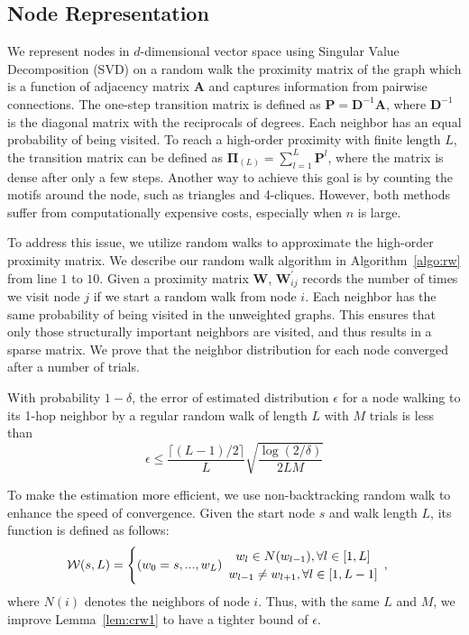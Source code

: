 \subsection{Node Representation} \label{ssec:ne}
We represent nodes in $d$-dimensional vector space using Singular Value Decomposition (SVD) on a random walk the proximity matrix of the graph which is a function of adjacency matrix ${\boldsymbol A}$ and captures information from pairwise connections.
The one-step transition matrix is defined as ${\boldsymbol P}={\boldsymbol D}^{-1}{\boldsymbol A}$, where ${\boldsymbol D}^{-1}$ is the diagonal matrix with the reciprocals of degrees. Each neighbor has an equal probability of being visited.
To reach a high-order proximity with finite length $L$, the transition matrix can be defined as ${\boldsymbol \Pi}_{(L)}=\sum_{l=1}^{L}{{\boldsymbol P}^{l}}$, where the matrix is dense after only a few steps.
Another way to achieve this goal is by counting the motifs around the node, such as triangles and 4-cliques. 
However, both methods suffer from computationally expensive costs, especially when $n$ is large.

To address this issue, we utilize random walks to approximate the high-order proximity matrix. We describe our random walk algorithm in Algorithm~\ref{algo:rw} from line $1$ to $10$. Given a proximity matrix ${\boldsymbol W}$, ${\boldsymbol W}^{'}_{ij}$ records the number of times we visit node $j$ if we start a random walk from node $i$. Each neighbor has the same probability of being visited in the unweighted graphs.
This ensures that only those structurally important neighbors are visited, and thus results in a sparse matrix.
We prove that the neighbor distribution for each node converged after a number of trials.

\begin{lemma}  \label{lem:crw1}
With probability $1 - \delta$, the error of estimated distribution $\epsilon$ for a node walking to its 1-hop neighbor by a regular random walk of length $L$ with $M$ trials is less than
\begin{equation}
    \epsilon \leq \frac{\lceil (L - 1) / 2 \rceil}{L} \sqrt{\frac{\log{(2/\delta)}}{2LM}}
\end{equation}
\end{lemma}

To make the estimation more efficient, we use non-backtracking random walk to enhance the speed of convergence.
Given the start node $s$ and walk length $L$, its function is defined as follows:
\begin{equation}
\mathcal{W}(s, L) = 
\begin{cases} (w_{0}=s, ..., w_{L}) \space 
\begin{array}{c}
w_{l} \in N{(w_{l-1})}, \forall l \in [1, L]
\\
w_{l-1} \neq w_{l+1}, \forall l\in [1, L-1]
\end{array},
\end{cases}
\end{equation}
where $N(i)$ denotes the neighbors of node $i$. Thus, with the same $L$ and $M$, we improve Lemma~\ref{lem:crw1} to have a tighter bound of $\epsilon$.

